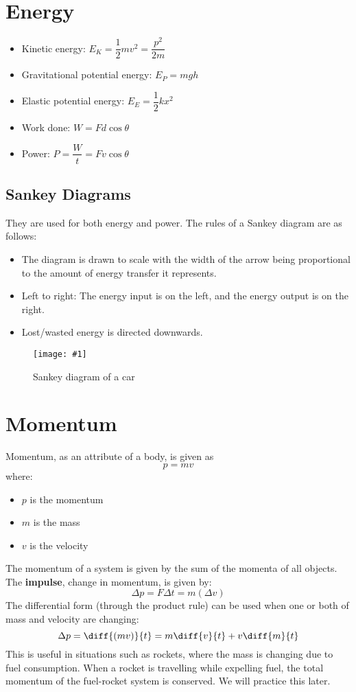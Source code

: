 \documentclass[a4paper,12pt]{article}
\let\oldsection\section
\renewcommand\section{\clearpage\oldsection}
\newcommand{\lb}{\\[8pt]}
\newcommand{\img}[4]{\begin{center}
  \begin{figure}[H]
    \centering
    \texttt{[image: \#1]}
    \caption{#3}
    \label{fig:#4}
  \end{figure}
\end{center}}
\begin{document}
\section{Energy}

\begin{itemize}
  \item Kinetic energy: $E_K = \dfrac{1}{2}mv^2 = \dfrac{p^2}{2m}$
  \item Gravitational potential energy: $E_P = mgh$
  \item Elastic potential energy: $E_E = \dfrac{1}{2}kx^2$
  \item Work done: $W = Fd\cos \theta$
  \item Power: $P = \dfrac{W}{t} = Fv\cos \theta$
\end{itemize}

\subsection{Sankey Diagrams}

They are used for both energy and power. The rules of a Sankey diagram are as follows:
\begin{itemize}
  \item The diagram is drawn to scale with the width of the arrow being proportional to the amount of energy transfer it represents.
  \item Left to right: The energy input is on the left, and the energy output is on the right.
  \item Lost/wasted energy is directed downwards.
\end{itemize}

\img{material/sankey.png}{0.5}{Sankey diagram of a car}{sankey}

\section{Momentum}

Momentum, as an attribute of a body, is given as
$$p = mv$$
where:
\begin{itemize}
  \item $p$ is the momentum
  \item $m$ is the mass
  \item $v$ is the velocity
\end{itemize}

The momentum of a system is given by the sum of the momenta of all objects.\lb
The \textbf{impulse}, change in momentum, is given by:
$$\Delta p = F \Delta t = m(\Delta v)$$
The differential form (through the product rule) can be used when one or both of mass and velocity are changing:
$$\Delta p = \diff{(mv)}{t} = m \diff{v}{t} + v \diff{m}{t}$$
This is useful in situations such as rockets, where the mass is changing due to fuel consumption. When a rocket is travelling while expelling fuel, the total momentum of the fuel-rocket system is conserved. We will practice this later.
\end{document}
